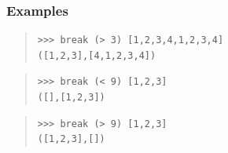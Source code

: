 \begin{haddockdesc}
{\begin{quote}
{\begin{verbatim}
\end{verbatim}}
\end{quote}
\subsubsection*{\textbf{Examples}}
\begin{quote}
{\haddockverb\begin{verbatim}
>>> break (> 3) [1,2,3,4,1,2,3,4]
([1,2,3],[4,1,2,3,4])

\end{verbatim}}
\end{quote}
\begin{quote}
{\haddockverb\begin{verbatim}
>>> break (< 9) [1,2,3]
([],[1,2,3])

\end{verbatim}}
\end{quote}
\begin{quote}
{\haddockverb\begin{verbatim}
>>> break (> 9) [1,2,3]
([1,2,3],[])

\end{verbatim}}
\end{quote}}
\end{haddockdesc}
